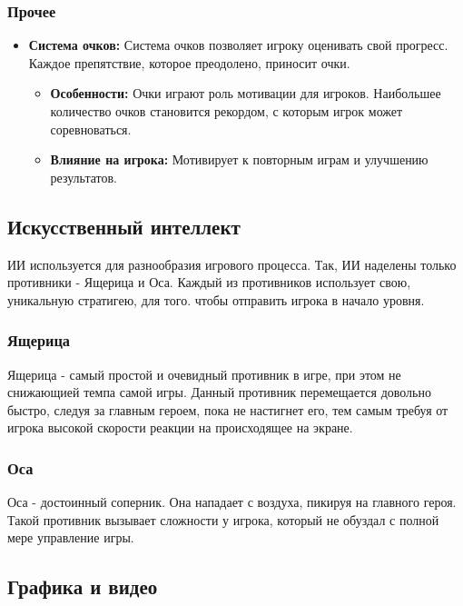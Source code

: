 \documentclass{article}
\begin{document}
\subsubsection{Прочее}
\begin{itemize}
    \item \textbf{Система очков:} Система очков позволяет игроку оценивать свой прогресс. Каждое препятствие, которое преодолено, приносит очки.
    \begin{itemize}
        \item \textbf{Особенности:} Очки играют роль мотивации для игроков. Наибольшее количество очков становится рекордом, с которым игрок может соревноваться.
        \item \textbf{Влияние на игрока:} Мотивирует к повторным играм и улучшению результатов.
    \end{itemize}
\end{itemize}

\subsection{Искусственный интеллект}
ИИ используется для разнообразия игрового процесса. Так, ИИ наделены только противники - Ящерица и Оса. Каждый из противников использует свою, уникальную стратигею, для того. чтобы отправить игрока в начало уровня.
\subsubsection{Ящерица}
Ящерица - самый простой и очевидный противник в игре, при этом не снижающией темпа самой игры. Данный противник перемещается довольно быстро, следуя за главным героем, пока не настигнет его, тем самым требуя от игрока высокой скорости реакции на происходящее на экране.
\subsubsection{Оса}
Оса - достоинный соперник. Она нападает с воздуха, пикируя на главного героя. Такой противник вызывает сложности у игрока, который не обуздал с полной мере управление игры.


\subsection{Графика и видео}
\end{document}
